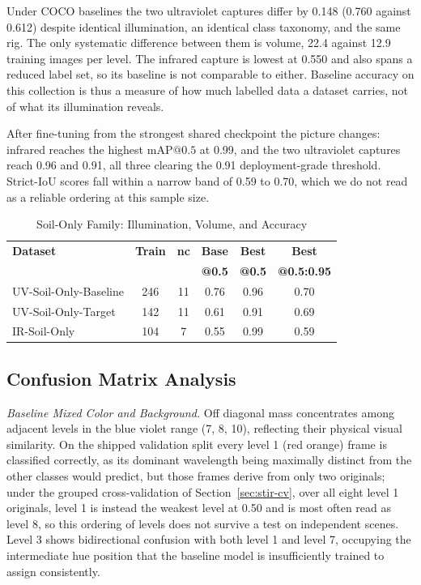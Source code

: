 ﻿\documentclass[journal]{IEEEtran}
\begin{document}
Under COCO baselines the two ultraviolet captures differ by 0.148 (0.760 against 0.612) despite identical illumination, an identical class taxonomy, and the same rig. The only systematic difference between them is volume, 22.4 against 12.9 training images per level. The infrared capture is lowest at 0.550 and also spans a reduced label set, so its baseline is not comparable to either. Baseline accuracy on this collection is thus a measure of how much labelled data a dataset carries, not of what its illumination reveals.

After fine-tuning from the strongest shared checkpoint the picture changes: infrared reaches the highest $\text{mAP@0.5}$ at 0.99, and the two ultraviolet captures reach 0.96 and 0.91, all three clearing the 0.91 deployment-grade threshold. Strict-IoU scores fall within a narrow band of 0.59 to 0.70, which we do not read as a reliable ordering at this sample size.

\begin{table}[!t]
\renewcommand{\arraystretch}{1.3}
\caption{Soil-Only Family: Illumination, Volume, and Accuracy}
\label{tab:modality}
\centering
\footnotesize
\setlength{\tabcolsep}{3.5pt}
\begin{tabular}{l c c c c c}
\toprule
\textbf{Dataset} & \textbf{Train} & \textbf{nc} & \textbf{Base} & \textbf{Best} & \textbf{Best} \\
 & & & \textbf{@0.5} & \textbf{@0.5} & \textbf{@0.5:0.95} \\
\midrule
UV-Soil-Only-Baseline & 246 & 11 & 0.76 & 0.96 & 0.70 \\
UV-Soil-Only-Target & 142 & 11 & 0.61 & 0.91 & 0.69 \\
IR-Soil-Only & 104 & 7 & 0.55 & 0.99 & 0.59 \\
\bottomrule
\end{tabular}
\end{table}

\subsection{Confusion Matrix Analysis}
\emph{Baseline Mixed Color and Background.} Off diagonal mass concentrates among adjacent levels in the blue violet range (7, 8, 10), reflecting their physical visual similarity. On the shipped validation split every level 1 (red orange) frame is classified correctly, as its dominant wavelength being maximally distinct from the other classes would predict, but those frames derive from only two originals; under the grouped cross-validation of Section~\ref{sec:stir-cv}, over all eight level 1 originals, level 1 is instead the weakest level at 0.50 and is most often read as level 8, so this ordering of levels does not survive a test on independent scenes. Level 3 shows bidirectional confusion with both level 1 and level 7, occupying the intermediate hue position that the baseline model is insufficiently trained to assign consistently.
\end{document}
